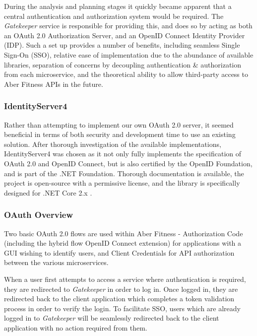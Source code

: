 During the analysis and planning stages it quickly became apparent that a central authentication and authorization system would be required. The \textit{Gatekeeper} service is responsible for providing this, and does so by acting as both an OAuth 2.0 Authorization Server, and an OpenID Connect Identity Provider (IDP). Such a set up provides a number of benefits, including seamless Single Sign-On (SSO), relative ease of implementation due to the abundance of available libraries, separation of concerns by decoupling authentication \& authorization from each microservice, and the theoretical ability to allow third-party access to Aber Fitness APIs in the future.

\subsubsection{IdentityServer4}

Rather than attempting to implement our own OAuth 2.0 server, it seemed beneficial in terms of both security and development time to use an existing solution. After thorough investigation of the available implementations, IdentityServer4\cite{identityserver4} was chosen as it not only fully implements the specification of OAuth 2.0 and OpenID Connect, but is also certified by the OpenID Foundation, and is part of the .NET Foundation\cite{identityserver4docs}. Thorough documentation is available, the project is open-source with a permissive license, and the library is specifically designed for .NET Core 2.x .

\subsubsection{OAuth Overview}

Two basic OAuth 2.0 flows are used within Aber Fitness - Authorization Code (including the hybrid flow OpenID Connect extension) for applications with a GUI wishing to identify users, and Client Credentials for API authorization between the various microservices.

When a user first attempts to access a service where authentication is required, they are redirected to \textit{Gatekeeper} in order to log in. Once logged in, they are redirected back to the client application which completes a token validation process in order to verify the login. To facilitate SSO, users which are already logged in to \textit{Gatekeeper} will be seamlessly redirected back to the client application with no action required from them.

